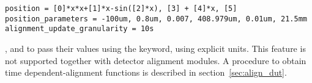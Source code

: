 \begin{verbatim}
position = [0]*x*x+[1]*x-sin([2]*x), [3] + [4]*x, [5]
position_parameters = -100um, 0.8um, 0.007, 408.979um, 0.01um, 21.5mm
alignment_update_granularity = 10s
\end{verbatim}

, and to pass their values using the  keyword, using explicit units. This feature is not supported together with detector alignment modules. A procedure to obtain time dependent-alignment functions is described in section~\ref{sec:align_dut}.
